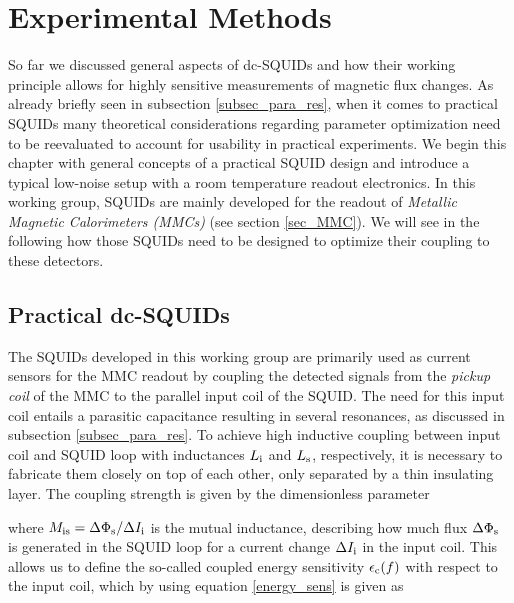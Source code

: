 \chapter{Experimental Methods} \label{ch_methods}

So far we discussed general aspects of dc-SQUIDs and how their working principle allows for highly sensitive measurements of magnetic flux changes. As already briefly seen in subsection \ref{subsec_para_res}, when it comes to practical SQUIDs many theoretical considerations regarding parameter optimization need to be reevaluated to account for usability in practical experiments. We begin this chapter with general concepts of a practical SQUID design and introduce a typical low-noise setup with a room temperature readout electronics. In this working group, SQUIDs are mainly developed for the readout of \textit{Metallic Magnetic Calorimeters (MMCs)} (see section \ref{sec_MMC}). We will see in the following how those SQUIDs need to be designed to optimize their coupling to these detectors. %

\section{Practical dc-SQUIDs}\label{sec_practical_SQUID}

The SQUIDs developed in this working group are primarily used as current sensors for the MMC readout by coupling the detected signals from the \textit{pickup coil} of the MMC to the parallel input coil of the SQUID. The need for this input coil entails a parasitic capacitance resulting in several resonances, as discussed in subsection \ref{subsec_para_res}. To achieve high inductive coupling between input coil and SQUID loop with inductances $L_{\rm i}$ and $L_{\rm s}$, respectively, it is necessary to fabricate them closely on top of each other, only separated by a thin insulating layer. The coupling strength is given by the dimensionless parameter 


where $M_{\rm is}=\Delta\Phi_{\rm s}/\Delta I_{\rm i}$ is the mutual inductance, describing how much flux $\Delta\Phi_{\rm s}$ is generated in the SQUID loop for a current change $\Delta I_{\rm i}$ in the input coil. This allows us to define the so-called coupled energy sensitivity $\epsilon_{\rm c}(f)$ with respect to the input coil, which by using equation \ref{energy_sens} is given as

